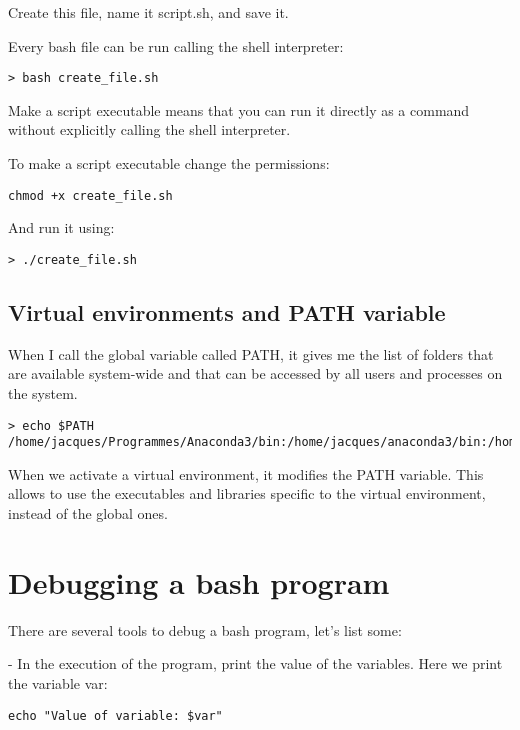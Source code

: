 \documentclass[24pt]{article}
\begin{document}
Create this file, name it script.sh, and save it.

Every bash file can be run calling the shell interpreter:
\begin{lstlisting}
> bash create_file.sh
\end{lstlisting}



Make a script executable means that you can run it directly as a command without explicitly calling the shell interpreter. 



To make a script executable change the permissions:
\begin{lstlisting}
chmod +x create_file.sh
\end{lstlisting}

And run it using:

\begin{lstlisting}
> ./create_file.sh
\end{lstlisting}

\subsection{Virtual environments and PATH variable}

When I call the global variable called PATH, it gives me the list of folders that are available system-wide and that can be accessed by all users and processes on the system. 

\begin{lstlisting}
> echo $PATH
/home/jacques/Programmes/Anaconda3/bin:/home/jacques/anaconda3/bin:/home/jacques/Programmes/anaconda3/bin:/home/jacques/Programmes/anaconda3/bin:/usr/local/sbin:/usr/local/bin:/usr/sbin:/usr/bin:/sbin:/bin:/usr/games:/usr/local/games:/snap/bin 
\end{lstlisting}
 
When we activate a virtual environment, it modifies the PATH 
variable. This allows to use the executables and libraries specific to the virtual environment, instead of the global ones. 
 
 
\section{Debugging a bash program}

There are several tools to debug a bash program, let's list some:

- In the execution of the program, print the value of the variables. Here we print the variable var:
\begin{lstlisting}
echo "Value of variable: $var"
\end{lstlisting}
\end{document}
